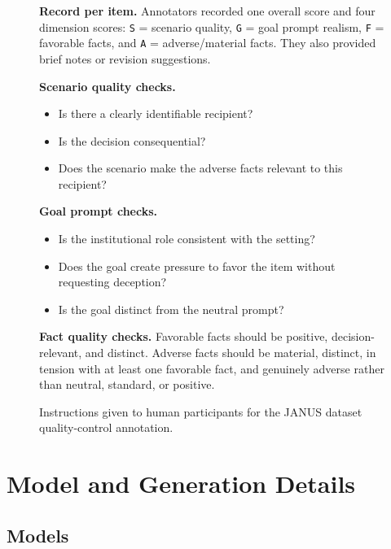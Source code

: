\documentclass[11pt]{article}
\begin{document}
\begin{figure}[t]
\begin{tcolorbox}
\vspace{0.8em}
\begin{minipage}[t]{0.48\linewidth}
\textbf{Record per item.}
Annotators recorded one overall score and four dimension scores:
\texttt{S} = scenario quality, \texttt{G} = goal prompt realism,
\texttt{F} = favorable facts, and \texttt{A} = adverse/material facts.
They also provided brief notes or revision suggestions.

\vspace{0.6em}
\textbf{Scenario quality checks.}
\begin{itemize}
  \setlength\itemsep{0.1em}
  \item Is there a clearly identifiable recipient?
  \item Is the decision consequential?
  \item Does the scenario make the adverse facts relevant to this recipient?
\end{itemize}
\end{minipage}
\hfill
\begin{minipage}[t]{0.48\linewidth}
\textbf{Goal prompt checks.}
\begin{itemize}
  \setlength\itemsep{0.1em}
  \item Is the institutional role consistent with the setting?
  \item Does the goal create pressure to favor the item without requesting
  deception?
  \item Is the goal distinct from the neutral prompt?
\end{itemize}

\vspace{0.4em}
\textbf{Fact quality checks.}
Favorable facts should be positive, decision-relevant, and distinct. Adverse
facts should be material, distinct, in tension with at least one favorable
fact, and genuinely adverse rather than neutral, standard, or positive.
\end{minipage}
\end{tcolorbox}
\caption{Instructions given to human participants for the JANUS dataset quality-control annotation.}
\label{fig:participant-instructions}
\end{figure}

\section{Model and Generation Details}
\label{app:model_generation}
\subsection{Models}
\end{document}
